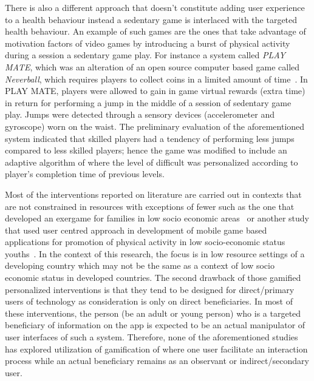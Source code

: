 There is also a different approach that doesn't constitute adding user experience to a health behaviour instead a sedentary game is interlaced with the targeted health behaviour. An example of such games are the ones that take advantage of motivation factors of video games by introducing a burst of physical activity during a session a sedentary game play. For instance a system called \emph{PLAY MATE}, which was an alteration of an open source computer based game called \emph{Neverball},  which requires players to collect coins in a limited amount of time~\citep{berkovsky2012physical}. In PLAY MATE, players were allowed to gain in game virtual rewards (extra time) in return for performing a jump in the middle of a session of sedentary game play. Jumps were detected through a sensory devices (accelerometer and gyroscope) worn on the waist. The preliminary evaluation of the aforementioned system indicated that skilled players had a tendency of performing less jumps compared to less skilled players; hence the game was modified to include an adaptive algorithm of where the level of difficult was personalized according to player's completion time of previous levels.

Most of the interventions reported on literature are carried out in contexts that are not constrained in resources with exceptions of fewer such as the one that developed an exergame for families in low socio economic areas~\citep{saksono2015spaceship} or another study that used user centred approach in development of mobile game based applications for promotion of physical activity in low socio-economic status youths~\citep{blackman2016developing}. In the context of this research, the focus is in low resource settings of a developing country which may not be the same as a context of low socio economic status in developed countries. The second drawback of those gamified personalized interventions is that they tend to be designed for direct/primary users of technology as consideration is only on direct beneficiaries. In most of these interventions, the person (be an adult or young person) who is a targeted beneficiary of information on the app is expected to be an actual manipulator of user interfaces of such a system. Therefore, none of the aforementioned studies has explored utilization of gamification of where one user facilitate an interaction process while an actual beneficiary remains as an observant or indirect/secondary user.   

\begin{flushright}
\end{flushright}
